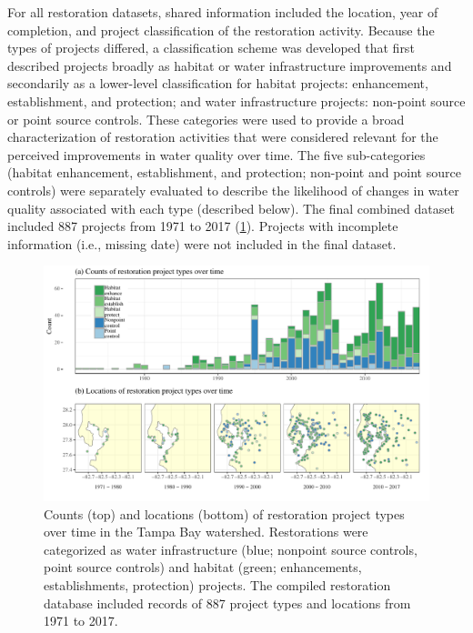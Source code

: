 \documentclass[]{article}
\begin{document}
For all restoration datasets, shared information included the location,
year of completion, and project classification of the restoration
activity. Because the types of projects differed, a classification
scheme was developed that first described projects broadly as habitat or
water infrastructure improvements and secondarily as a lower-level
classification for habitat projects: enhancement, establishment, and
protection; and water infrastructure projects: non-point source or point
source controls. These categories were used to provide a broad
characterization of restoration activities that were considered relevant
for the perceived improvements in water quality over time. The five
sub-categories (habitat enhancement, establishment, and protection;
non-point and point source controls) were separately evaluated to
describe the likelihood of changes in water quality associated with each
type (described below). The final combined dataset included 887 projects
from 1971 to 2017 (\cref{fig:restyrs}). Projects with incomplete
information (i.e., missing date) were not included in the final dataset.

\begin{figure}
\centerline{\includegraphics[width = \textwidth]{figs/restyrs.pdf}}
\caption{Counts (top) and locations (bottom) of restoration project types over time in the Tampa Bay watershed.  Restorations were categorized as water infrastructure (blue; nonpoint source controls, point source controls) and habitat (green; enhancements, establishments, protection) projects.  The compiled restoration database included records of 887 project types and locations from 1971 to 2017.}
\label{fig:restyrs}
\end{figure}
\end{document}

